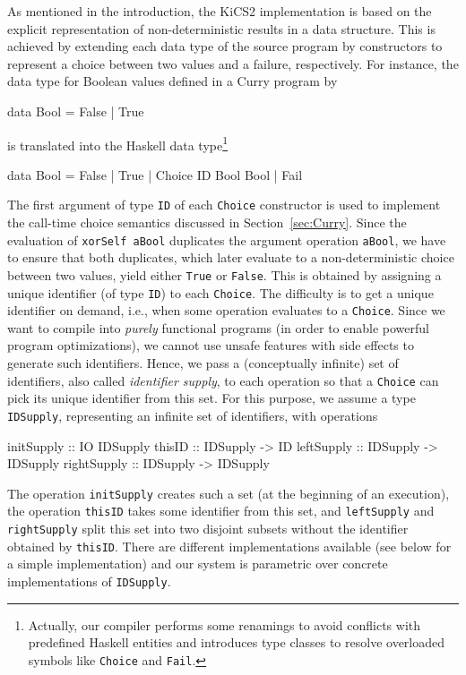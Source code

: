 \documentclass{llncs}
\newcommand{\code}[1]{\mbox{\small\texttt{#1}}}
\begin{document}
As mentioned in the introduction, the KiCS2 implementation
is based on the explicit representation of non-deterministic results
in a data structure.
This is achieved by extending each data type of the source program
by constructors to represent a choice between two values
and a failure, respectively.
For instance, the data type for Boolean values defined in a Curry program by
\begin{curry}
  data Bool = False | True
\end{curry}
is translated into the Haskell data type\footnote{Actually,
our compiler performs some renamings to avoid conflicts with
predefined Haskell entities and introduces type classes
to resolve overloaded symbols like \code{Choice} and \code{Fail}.}
\begin{haskell}
  data Bool = False | True | Choice ID Bool Bool | Fail
\end{haskell}
The first argument of type \code{ID} of each \code{Choice} constructor
is used to implement the call-time choice semantics
discussed in Section~\ref{sec:Curry}.
Since the evaluation of \code{xorSelf aBool} duplicates
the argument operation \code{aBool}, we have to ensure
that both duplicates, which later evaluate to a non-deterministic
choice between two values, yield either \code{True} or \code{False}.
This is obtained by assigning a unique identifier (of type \code{ID})
to each \code{Choice}. The difficulty is to get a unique identifier
on demand, i.e., when some operation evaluates to a \code{Choice}.
Since we want to compile into \emph{purely} functional programs
(in order to enable powerful program optimizations),
we cannot use unsafe features with side effects to generate
such identifiers.
Hence, we pass a (conceptually infinite) set of identifiers,
also called \emph{identifier supply},
to each operation so that a \code{Choice} can pick its unique identifier from
this set.
For this purpose, we assume a type \code{IDSupply},
representing an infinite set of identifiers,
with operations
\begin{haskell}
  initSupply  :: IO IDSupply
  thisID      :: IDSupply -> ID
  leftSupply  :: IDSupply -> IDSupply
  rightSupply :: IDSupply -> IDSupply
\end{haskell}
The operation \code{initSupply} creates such a set (at the beginning
of an execution),
the operation \code{thisID} takes some identifier from this set, and
\code{leftSupply} and \code{rightSupply} split this set
into two disjoint subsets without the identifier
obtained by \code{thisID}.
There are different implementations available \cite{AugustssonRittriSynek94}
(see below for a simple implementation) and our system
is parametric over concrete implementations of \code{IDSupply}.
\end{document}
